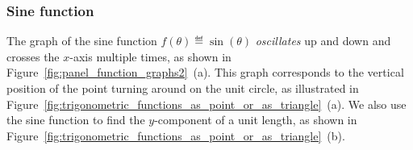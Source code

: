 		\subsubsection{Sine function}

			The graph of the sine function $f(\theta) \eqdef \sin(\theta)$
			\emph{oscillates} up and down and crosses the $x$-axis multiple times,
			as shown in Figure~\ref{fig:panel_function_graphs2}~(a).
			This graph corresponds to the vertical position of the point turning around on the unit circle,
			as illustrated in Figure~\ref{fig:trigonometric_functions_as_point_or_as_triangle}~(a).
			We also use the sine function to find the $y$-component of a unit length,
			as shown in Figure~\ref{fig:trigonometric_functions_as_point_or_as_triangle}~(b).


